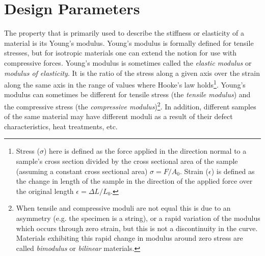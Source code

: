 \documentclass[final]{svjour2}
\begin{document}
\section{Design Parameters}

The property that is primarily used to describe the stiffness or elasticity of a material is its Young's modulus. Young's modulus is formally defined for tensile stresses, but for isotropic materials one can extend the notion for use with compressive forces. Young's modulus is sometimes called the {\em elastic modulus} or {\em modulus of elasticity}. It is the ratio of the stress along a given axis over the strain along the same axis in the range of values where Hooke's law holds\footnote{Stress ($\sigma$) here is defined as the force applied in the direction normal to a sample's cross section divided by the cross sectional area of the sample (assuming a constant cross sectional area) $\sigma = F/A_{0}$.  Strain ($\epsilon$) is defined as the change in length of the sample in the direction of the applied force over the original length $\epsilon=\Delta L/L_{0}$.}. Young's modulus can sometimes be different for tensile stress (the {\em tensile modulus}) and the compressive stress (the {\em compressive modulus})\footnote{When tensile and compressive moduli are not equal this is due to an asymmetry (e.g. the specimen is a string), or a rapid variation of the modulus which occurs through zero strain, but this is not a discontinuity in the curve. Materials exhibiting this rapid change in modulus around zero stress are called {\em bimodulus} or {\em bilinear} materials.}. In addition, different samples of the same material may have different moduli as a result of their defect characteristics, heat treatments, etc.
\end{document}
